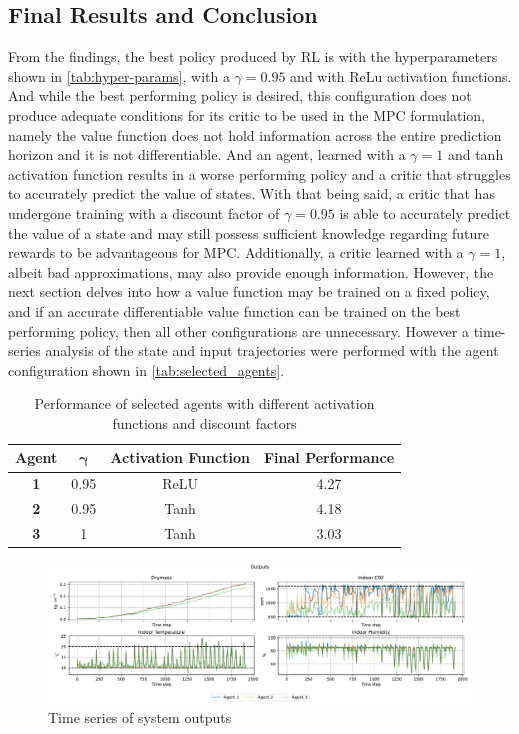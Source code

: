 \subsection{Final Results and Conclusion}
\label{section:rl-deterministic-results}
From the findings, the best policy produced by RL is with the hyperparameters shown in \autoref{tab:hyper-params}, with a $\gamma = 0.95$ and with ReLu activation functions. And while the best performing policy is desired, this configuration does not produce adequate conditions for its critic to be used in the MPC formulation, namely the value function does not hold information across the entire prediction horizon and it is not differentiable. And an agent, learned with a $\gamma = 1$ and tanh activation function results in a worse performing policy and a critic that struggles to accurately predict the value of states. With that being said, a critic that has undergone training with a discount factor of $\gamma = 0.95$ is able to accurately predict the value of a state and may still possess sufficient knowledge regarding future rewards to be advantageous for MPC. Additionally, a critic learned with a $\gamma = 1$, albeit bad approximations, may also provide enough information.
However, the next section delves into how a value function may be trained on a fixed policy, and if an accurate differentiable value function can be trained on the best performing policy, then all other configurations are unnecessary. However a time-series analysis of the state and input trajectories were performed with the agent configuration shown in \autoref{tab:selected_agents}. 

\begin{table}[h!]
	\centering
	\begin{tabular}{c c c c}
		\toprule
		\textbf{Agent} & $\boldsymbol{\gamma}$ & \textbf{Activation Function} & \textbf{Final Performance} \\
		\midrule
		\textbf{ 1} & 0.95 & ReLU & 4.27 \\
		\textbf{ 2} & 0.95 & Tanh & 4.18 \\
		\textbf{ 3} & 1 & Tanh & 3.03 \\
		\bottomrule
	\end{tabular}
	\caption{Performance of selected agents with different activation functions and discount factors}
	\label{tab:selected_agents}
\end{table}

\begin{figure}[H]
    \centering
    \includegraphics[width = \textwidth]{figures/selected_policies_outputs.pdf}
    \caption{Time series of system outputs}
    \label{fig:selected-policies-outputs}
\end{figure}

